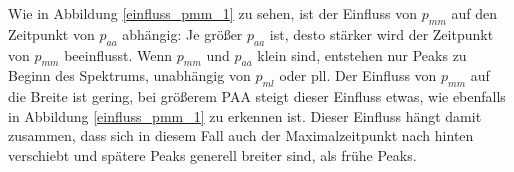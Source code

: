 Wie in Abbildung \ref{einfluss_pmm_1} zu sehen, ist der Einfluss von $p_{mm}$ auf den Zeitpunkt von $p_{aa}$ abhängig: Je größer $p_{aa}$ ist, desto stärker wird der Zeitpunkt von $p_{mm}$ beeinflusst. Wenn $p_{mm}$ und $p_{aa}$ klein sind, entstehen nur Peaks zu Beginn des Spektrums, unabhängig von $p_{ml}$ oder pll.
Der Einfluss von $p_{mm}$ auf die Breite ist gering, bei größerem PAA steigt dieser Einfluss etwas, wie ebenfalls in Abbildung \ref{einfluss_pmm_1} zu erkennen ist. Dieser Einfluss hängt damit zusammen, dass sich in diesem Fall auch der Maximalzeitpunkt nach hinten verschiebt und spätere Peaks generell breiter sind, als frühe Peaks.



